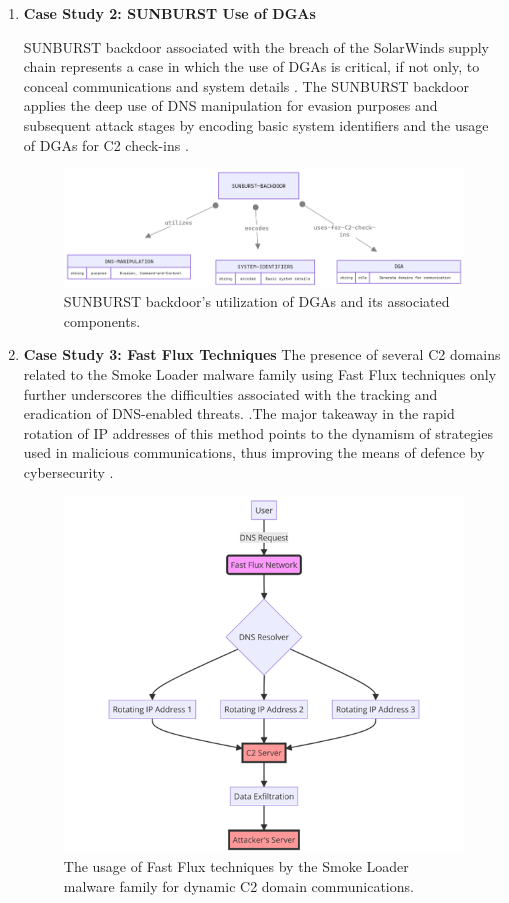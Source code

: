 \begin{enumerate}
\item\textbf{ Case Study 2: SUNBURST Use of DGAs}

SUNBURST backdoor associated with the breach of the SolarWinds supply chain represents a case in which the use of DGAs is critical, if not only, to conceal communications and system details \cite{paloaltonetworks2021dnsattacks}. The SUNBURST backdoor applies the deep use of DNS manipulation for evasion purposes and subsequent attack stages by encoding basic system identifiers and the usage of DGAs for C2 check-ins \cite{unit42_solarstorm_2021}.

\captionsetup{font= footnotesize}
\begin{figure}[H] 
    \centering
    \includegraphics[width=0.8\linewidth]{background/SUNDNS.png}
    \caption{SUNBURST backdoor's utilization of DGAs and its associated components.}
    \label{fig:figEleven}
\end{figure}

\item\textbf{ Case Study 3: Fast Flux Techniques}
The presence of several C2 domains related to the Smoke Loader malware family using Fast Flux techniques only further underscores the difficulties associated with the tracking and eradication of DNS-enabled threats. \cite{paloaltonetworks2021dnsattacks}.The major takeaway in the rapid rotation of IP addresses of this method points to the dynamism of strategies used in malicious communications, thus improving the means of defence by cybersecurity \cite{unit42_fastflux_2021}.

\captionsetup{font= footnotesize}
\begin{figure}[H]
    \centering
    \includegraphics[width=0.8\linewidth]{background/FastFluDNS.png}
    \caption{The usage of Fast Flux techniques by the Smoke Loader malware family for dynamic C2 domain communications.}
    \label{fig:figTweleve}
\end{figure}



\end{enumerate}
